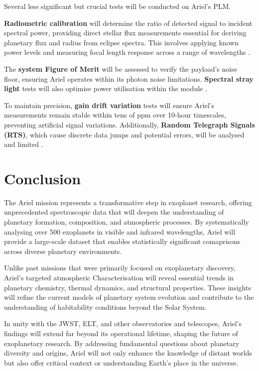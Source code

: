 \documentclass[12pt]{article}
\begin{document}
Several less significant but crucial tests will be conducted on Ariel's PLM.

\textbf{Radiometric calibration} will determine the ratio of detected signal to incident spectral power, providing direct stellar flux measurements essential for deriving planetary flux and radius from eclipse spectra. This involves applying known power levels and measuring focal length response across a range of wavelengths \cite{spry2023testing}.

The \textbf{system Figure of Merit} will be assessed to verify the payload's noise floor, ensuring Ariel operates within its photon noise limitations. \textbf{Spectral stray light} tests will also optimise power utilisation within the module \cite{spry2023testing}.

To maintain precision, \textbf{gain drift variation} tests will ensure Ariel's measurements remain stable within tens of ppm over 10-hour timescales, preventing artificial signal variations. Additionally, \textbf{Random Telegraph Signals (RTS)},
which cause discrete data jumps and potential errors, will be analysed and limited \cite{spry2023testing}.

\newpage

\section{Conclusion} \label{sec:5}

The Ariel mission represents a transformative step in exoplanet research, offering unprecedented spectroscopic data that will deepen the understanding of planetary formation, composition, and atmospheric processes. By systematically analysing
over 500 exoplanets in visible and infrared wavelengths, Ariel will provide a large-scale dataset that enables statistically significant comaprisons across diverse planetary environments.

Unlike past missions that were primarily focused on exoplanetary discovery, Ariel's targeted atmospheric Characterisation will reveal essential trends in planetary chemistry, thermal dynamics, and structural properties. These insights will refine the current models of 
planetary system evolution and contribute to the understanding of habitability conditions beyond the Solar System.

In unity with the JWST, ELT, and other observatories and telescopes, Ariel's findings will extend far beyond its operational lifetime, shaping the future of exoplanetary research. By addressing fundamental
questions about planetary diversity and origins, Ariel will not only enhance the knowledge of distant worlds but also offer critical context or understanding Earth's place in the universe.
\end{document}
